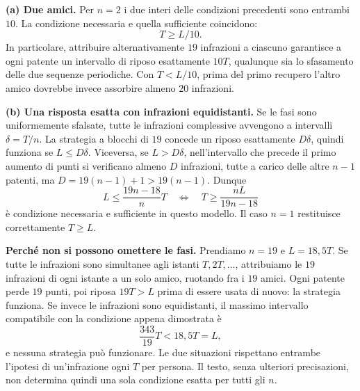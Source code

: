 {\textbf{(a) Due amici.}
Per $n=2$ i due interi delle condizioni precedenti sono entrambi $10$.
La condizione necessaria e quella sufficiente coincidono:
\[
 \boxed{T\ge L/10.}
\]
In particolare, attribuire alternativamente $19$ infrazioni a ciascuno
garantisce a ogni patente un intervallo di riposo esattamente $10T$,
qualunque sia lo sfasamento delle due sequenze periodiche.
Con $T<L/10$, prima del primo recupero l'altro amico dovrebbe invece
assorbire almeno $20$ infrazioni.

\textbf{(b) Una risposta esatta con infrazioni equidistanti.}
Se le fasi sono uniformemente sfalsate, tutte le infrazioni complessive
avvengono a intervalli $\delta=T/n$.
La strategia a blocchi di $19$ concede un riposo esattamente
$D\delta$, quindi funziona se $L\le D\delta$.
Viceversa, se $L>D\delta$, nell'intervallo che precede il primo aumento
di punti si verificano almeno $D$ infrazioni, tutte a carico delle altre
$n-1$ patenti, ma $D=19(n-1)+1>19(n-1)$.
Dunque
\[
 L\le\frac{19n-18}{n}T
 \quad\Longleftrightarrow\quad
 T\ge\frac{nL}{19n-18}
\]
\`e condizione necessaria e sufficiente in questo modello.
Il caso $n=1$ restituisce correttamente $T\ge L$.

\textbf{Perch\'e non si possono omettere le fasi.}
Prendiamo $n=19$ e $L=18{,}5T$.
Se tutte le infrazioni sono simultanee agli istanti $T,2T,\ldots$,
attribuiamo le $19$ infrazioni di ogni istante a un solo amico,
ruotando fra i $19$ amici. Ogni patente perde $19$ punti, poi riposa
$19T>L$ prima di essere usata di nuovo: la strategia funziona.
Se invece le infrazioni sono equidistanti, il massimo intervallo
compatibile con la condizione appena dimostrata \`e
\[
 \frac{343}{19}T<18{,}5T=L,
\]
e nessuna strategia pu\`o funzionare.
Le due situazioni rispettano entrambe l'ipotesi di un'infrazione ogni $T$
per persona. Il testo, senza ulteriori precisazioni, non determina
quindi una sola condizione esatta per tutti gli $n$.
}
\renewcommand{\SoluzioniAlternative}{}
\renewcommand{\Osservazioni}{}
\renewcommand{\Commenti}{}
